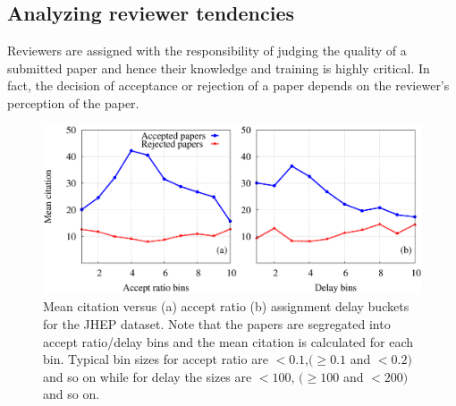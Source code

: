 \noindent
\subsection{Analyzing reviewer tendencies}
\label{reviewer}
Reviewers are assigned with the responsibility of judging the quality of a submitted paper and hence their knowledge and training is highly critical. 
In fact, the decision of acceptance or rejection of a paper depends on the reviewer's perception of the paper. 





\begin{figure}
 \centering
 \includegraphics[scale = 0.3]{./texfiles/Chapter_4/cikm_17/figures/citation_delay_acpt_ratio_jhep.eps}
 \caption{\label{a_d_jhep} Mean citation versus (a) accept ratio (b) assignment delay buckets for the JHEP dataset. 
 Note that the papers are segregated into accept ratio/delay bins and the mean citation is calculated for each bin. 
 Typical bin sizes for accept ratio are $<0.1$,$(\geq 0.1$ and $<0.2)$ and so on while for delay the sizes are $<100$, $(\geq 100$ and $< 200)$ and so on.\vspace{4mm}}
\vspace{3mm}
 \end{figure}

